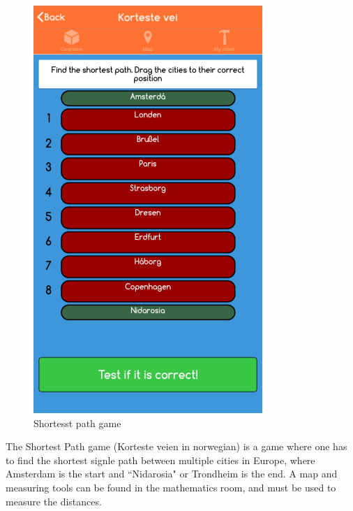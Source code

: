 \begin{figure}[H]
    \centering
    \includegraphics[width=\textwidth]{images/app/shortest.png}
    \caption{Shortesst path game}
    \label{fig:shortest}
\end{figure}

The Shortest Path game (Korteste veien in norwegian) is a game where one has to find the shortest signle path between multiple cities in Europe, where Amsterdam is the start and ``Nidarosia" or Trondheim is the end. A map and measuring tools can be found in the mathematics room, and must be used to measure the distances.\\\\

